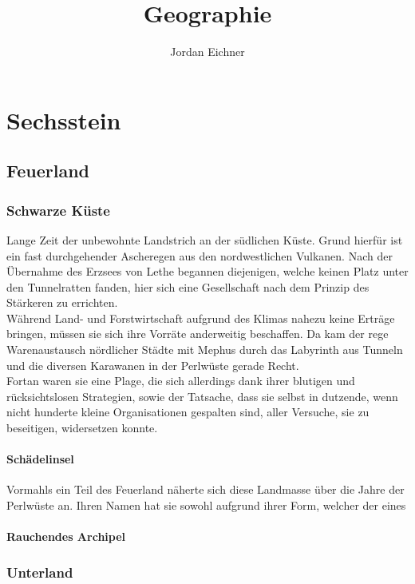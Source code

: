 \documentclass[a4paper,12pt,oneside]{book}
\title{Geographie}
\author{Jordan Eichner}
\date{}
\begin{document}
\maketitle
\tableofcontents

\part{Sechsstein}

\chapter{Feuerland}

\section{Schwarze Küste}
Lange Zeit der unbewohnte Landstrich an der südlichen Küste. Grund hierfür ist ein fast durchgehender Ascheregen aus den nordwestlichen Vulkanen. Nach der Übernahme des Erzsees von Lethe begannen diejenigen, welche keinen Platz unter den Tunnelratten fanden, hier sich eine Gesellschaft nach dem Prinzip des Stärkeren zu errichten. 
\\Während Land- und Forstwirtschaft aufgrund des Klimas nahezu keine Erträge bringen, müssen sie sich ihre Vorräte anderweitig beschaffen. Da kam der rege Warenaustausch nördlicher Städte mit Mephus durch das Labyrinth aus Tunneln und die diversen Karawanen in der Perlwüste gerade Recht.
\\Fortan waren sie eine Plage, die sich allerdings dank ihrer blutigen und rücksichtslosen Strategien, sowie der Tatsache, dass sie selbst in dutzende, wenn nicht hunderte kleine Organisationen gespalten sind, aller Versuche, sie zu beseitigen, widersetzen konnte.

\subsection{Schädelinsel}
Vormahls ein Teil des Feuerland näherte sich diese Landmasse über die Jahre der Perlwüste an. Ihren Namen hat sie sowohl aufgrund ihrer Form, welcher der eines 

\subsection{Rauchendes Archipel}



\section{Unterland}
\end{document}
